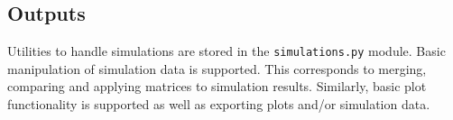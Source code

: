 \subsection{Outputs}
Utilities to handle simulations are stored in the \texttt{simulations.py} module. 
Basic manipulation of simulation data is supported.
This corresponds to merging, comparing and applying matrices to  simulation results.
Similarly, basic plot functionality is supported as well as exporting plots and/or simulation data.
 

